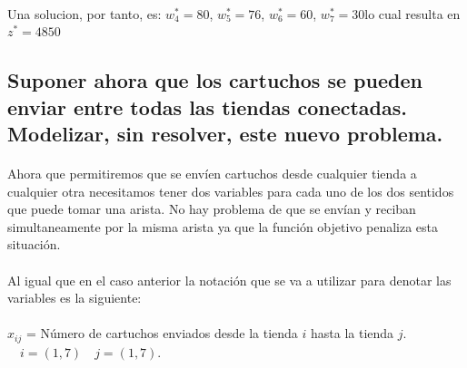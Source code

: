 \documentclass[10pt, a4paper]{article}
\begin{document}
			\paragraph{}
			Una solucion, por tanto, es: \(w_{4}^{*} = 80 \), \(w_{5}^{*} = 76 \), \(w_{6}^{*} = 60 \), \(w_{7}^{*} = 30 \)lo cual resulta en \(z^{*} = 4850\)

		\subsection{Suponer ahora que los cartuchos se pueden enviar entre todas las tiendas conectadas. Modelizar, sin resolver, este nuevo problema.}

			\paragraph{}
			Ahora que permitiremos que se envíen cartuchos desde cualquier tienda a cualquier otra necesitamos tener dos variables para cada uno de los dos sentidos que puede tomar una arista. No hay problema de que se envían y reciban simultaneamente por la misma arista ya que la función objetivo penaliza esta situación.

			\paragraph{}
			Al igual que en el caso anterior la notación que se va a utilizar para denotar las variables es la siguiente:

			\paragraph{}
			\(x_{ij}\) = Número de cartuchos enviados desde la tienda \(i\) hasta la tienda \(j\). \(\quad i=(1,7) \quad j=(1,7).\)
\end{document}
